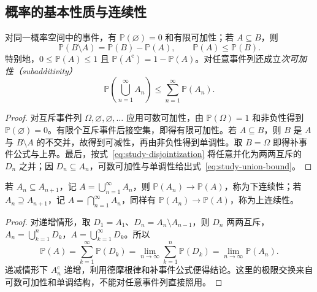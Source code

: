 \subsection{概率的基本性质与连续性}
\label{subsec:study-probability-properties}

\begin{proposition}
\label{prop:study-probability-properties}
对同一概率空间中的事件，有 $\mathbb P(\varnothing)=0$ 和有限可加性；若 $A\subseteq B$，则
\begin{equation}
 \mathbb P(B\setminus A)=\mathbb P(B)-\mathbb P(A),\qquad
 \mathbb P(A)\le\mathbb P(B).
 \label{eq:study-probability-monotonicity}
\end{equation}
特别地，$0\le\mathbb P(A)\le1$ 且 $\mathbb P(A^{\mathrm c})=1-\mathbb P(A)$。对任意事件列还成立\emph{次可加性（subadditivity）}
\begin{equation}
 \mathbb P\!\left(\bigcup_{n=1}^{\infty}A_n\right)
 \le\sum_{n=1}^{\infty}\mathbb P(A_n).
 \label{eq:study-union-bound}
\end{equation}
\end{proposition}

\begin{proof}
对互斥事件列 $\Omega,\varnothing,\varnothing,\ldots$ 应用可数可加性，由 $\mathbb P(\Omega)=1$ 和非负性得到 $\mathbb P(\varnothing)=0$。有限个互斥事件后接空集，即得有限可加性。若 $A\subseteq B$，则 $B$ 是 $A$ 与 $B\setminus A$ 的不交并，故得到可减性，再由非负性得到单调性。取 $B=\Omega$ 即得补事件公式与上界。最后，按式~\eqref{eq:study-disjointization} 将任意并化为两两互斥的 $D_n$ 之并；因 $D_n\subseteq A_n$，可数可加性与单调性给出式~\eqref{eq:study-union-bound}。
\end{proof}

\begin{theorem}[概率的连续性]
\label{thm:study-probability-continuity}
若 $A_n\subseteq A_{n+1}$，记 $A=\bigcup_{n=1}^{\infty}A_n$，则 $\mathbb P(A_n)\to\mathbb P(A)$，称为下连续性；若 $A_n\supseteq A_{n+1}$，记 $A=\bigcap_{n=1}^{\infty}A_n$，同样有 $\mathbb P(A_n)\to\mathbb P(A)$，称为上连续性。
\end{theorem}

\begin{proof}
对递增情形，取 $D_1=A_1$、$D_n=A_n\setminus A_{n-1}$，则 $D_n$ 两两互斥，$A_n=\bigcup_{k=1}^{n}D_k$，$A=\bigcup_{k=1}^{\infty}D_k$。所以
\[
 \mathbb P(A)=\sum_{k=1}^{\infty}\mathbb P(D_k)
 =\lim_{n\to\infty}\sum_{k=1}^{n}\mathbb P(D_k)
 =\lim_{n\to\infty}\mathbb P(A_n).
\]
递减情形下 $A_n^{\mathrm c}$ 递增，利用德摩根律和补事件公式便得结论。这里的极限交换来自可数可加性和单调结构，不能对任意事件列直接照用。
\end{proof}

